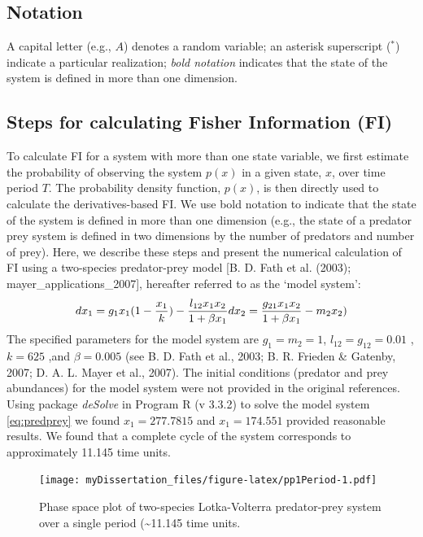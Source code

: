 \documentclass[12pt,twoside]{reedthesis}
\begin{document}
\subsection{Notation}\label{notation}

A capital letter (e.g., \(A\)) denotes a random variable; an asterisk
superscript (\(^*\)) indicate a particular realization; \emph{bold
notation} indicates that the state of the system is defined in more than
one dimension.

\subsection{Steps for calculating Fisher Information
(FI)}\label{steps-for-calculating-fisher-information-fi}

To calculate FI for a system with more than one state variable, we first
estimate the probability of observing the system \(p(x)\) in a given
state, \(x\), over time period \(T\). The probability density function,
\(p(x)\), is then directly used to calculate the derivatives-based FI.
We use bold notation to indicate that the state of the system is defined
in more than one dimension (e.g., the state of a predator prey system is
defined in two dimensions by the number of predators and number of
prey). Here, we describe these steps and present the numerical
calculation of FI using a two-species predator-prey model {[}B. D. Fath
et al. (2003); mayer\_applications\_2007{]}, hereafter referred to as
the `model system':
\begin{equation} 
  dx_1 = g_{1}x_{1}(1-\frac{x_1}{k})- \frac{l_{12} x_{1} x_{2}}{1+\beta x_{1}} \\
  dx_2 = \frac{g_{21}x_1 x_2}{1+\beta x_1} - m_2 x_2) \\
  \label{eq:predprey}
\end{equation}
The specified parameters for the model system are \(g_1=m_2=1\),
\(l_12=g_12 = 0.01\) , \(k=625\) ,and \(\beta=0.005\) (see B. D. Fath et
al., 2003; B. R. Frieden \& Gatenby, 2007; D. A. L. Mayer et al., 2007).
The initial conditions (predator and prey abundances) for the model
system were not provided in the original references. Using package
\emph{deSolve} in Program R (v 3.3.2) to solve the model system
\eqref{eq:predprey} we found \(x_1 = 277.7815\) and \(x_1= 174.551\)
provided reasonable results. We found that a complete cycle of the
system corresponds to approximately 11.145 time units.
\begin{figure}
\centering
\texttt{[image: myDissertation\_files/figure-latex/pp1Period-1.pdf]}
\caption{\label{fig:pp1Period}Phase space plot of two-species Lotka-Volterra
predator-prey system over a single period (\textasciitilde{}11.145 time
units.}
\end{figure}
\end{document}
